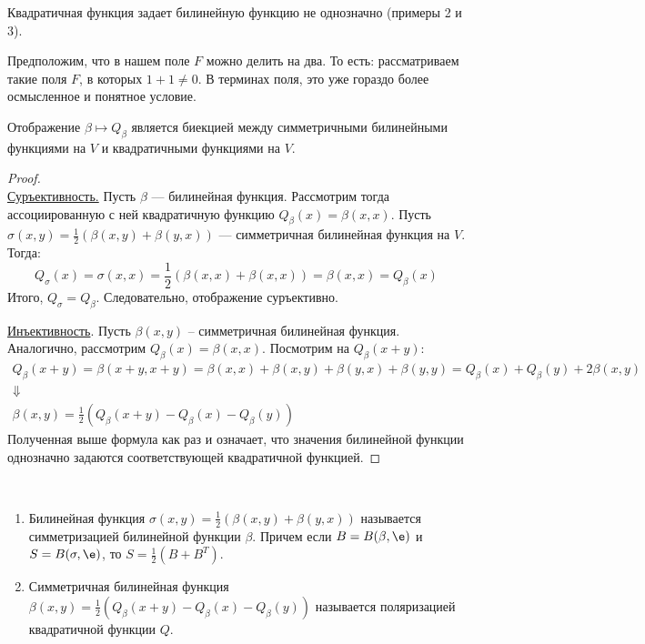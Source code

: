 \begin{Comment}
Квадратичная функция задает билинейную функцию не однозначно (примеры 2 и 3).
\end{Comment}

Предположим, что в нашем поле $F$ можно делить на два. То есть: рассматриваем такие поля $F$, в которых $1 + 1 \neq 0$. В терминах поля, это уже гораздо более осмысленное и понятное условие.

\begin{Theorem}
Отображение $\beta \mapsto Q_\beta$ является биекцией между симметричными билинейными функциями на $V$ и квадратичными функциями на $V$.
\end{Theorem}

\begin{proof}\ \\
\underline{Суръективность.} Пусть $\beta$ --- билинейная функция. Рассмотрим тогда ассоциированную с ней квадратичную функцию $Q_\beta(x) = \beta(x, x)$. Пусть $\sigma(x, y) = \frac{1}{2}(\beta(x, y) + \beta(y, x))$ --- симметричная билинейная функция на $V$. Тогда:
$$
Q_\sigma(x) = \sigma(x, x) = \frac{1}{2}(\beta(x, x) + \beta(x, x)) = \beta(x, x) = Q_\beta(x)
$$
Итого, $Q_\sigma = Q_\beta$. Следовательно, отображение суръективно.

\underline{Инъективность}. Пусть $\beta(x, y)$ -- симметричная билинейная функция. Аналогично, рассмотрим $Q_\beta(x) = \beta(x, x)$. Посмотрим на $Q_\beta(x + y)$:
\begin{gather*}
Q_\beta(x + y) = \beta(x + y, x + y) = \beta(x, x) + \beta(x, y) + \beta(y, x) + \beta(y, y) = Q_\beta(x) + Q_\beta(y) + 2\beta(x, y) \\
\Downarrow \\
\beta(x, y) = \frac{1}{2}\left( Q_\beta(x + y) - Q_\beta(x) - Q_\beta(y)  \right)
\end{gather*}
Полученная выше формула как раз и означает, что значения билинейной функции однозначно задаются соответствующей квадратичной функцией.
\end{proof}

\begin{Comment}\
\begin{enumerate}
\item Билинейная функция $\sigma(x, y) = \frac{1}{2}(\beta(x, y) + \beta(y, x))$ называется симметризацией билинейной функции $\beta$. Причем если $B = B(\beta, \e)$ и $S = B(\sigma, \e)$, то $S = \frac{1}{2}(B + B^T)$.
\item Симметричная билинейная функция $\beta(x, y) = \frac{1}{2}\left( Q_\beta(x + y) - Q_\beta(x) - Q_\beta(y)  \right)$ называется поляризацией квадратичной функции $Q$.
\end{enumerate}
\end{Comment}

